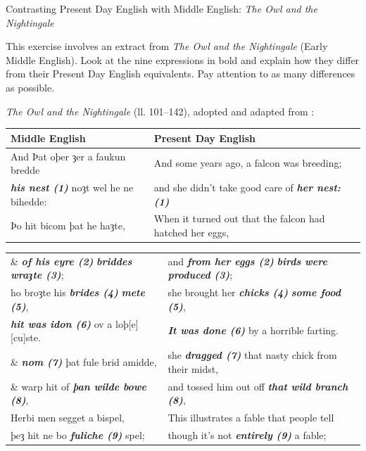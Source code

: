 \begin{exercises}{Contrasting Present Day English with Middle English: \textit{The Owl and the Nightingale}}\label{ex-Owl}

\chili{}

This exercise involves an extract from \textit{The Owl and the Nightingale} (Early Middle English). Look at the nine expressions in bold and explain how they differ from their Present Day English equivalents. Pay attention to as many differences as possible.

\textit{The Owl and the Nightingale} (ll. 101--142), adopted and adapted from \citet{Cartlidge2001}:\medskip

\noindent
\begin{tabularx}{\textwidth}{lQ}
 Middle English & Present Day English \\
 \midrule
 And Þat oþer ȝer a faukun bredde & And some years ago, a falcon was breeding;\\
 \emph{\textbf{his nest (1)}} noȝt wel he ne bihedde: & and she didn't take good care of \emph{\textbf{her nest: (1)}}\\ 
 Þo hit bicom þat he haȝte, & When it turned out that the falcon had hatched her eggs,\\
 \end{tabularx}
\begin{tabularx}{\textwidth}{lQ}
 \& \emph{\textbf{of his eyre (2)}} \emph{\textbf{briddes wraȝte (3)}}; & and \emph{\textbf{from her eggs (2)}} \emph{\textbf{birds were produced (3)}};\\
 ho broȝte his \emph{\textbf{brides (4)}} \emph{\textbf{mete (5)}}, & she brought her \emph{\textbf{chicks (4)}} \emph{\textbf{some food (5)}},\\
 \emph{\textbf{hit was idon (6)}} ov a loþ[e] [cu]ste. & \emph{\textbf{It was done (6)}} by a horrible farting.\\
 \& \emph{\textbf{nom (7)}} þat fule brid amidde, & she \emph{\textbf{dragged (7)}} that nasty chick from their midst,\\
 \& warp hit of \emph{\textbf{þan wilde bowe (8)}}, & and tossed him out off \emph{\textbf{that wild branch (8)}},\\
 Herbi men segget a bispel, & This illustrates a fable that people tell\\
 þeȝ hit ne bo \emph{\textbf{fuliche (9)}} spel; & though it's not \emph{\textbf{entirely (9)}} a fable;\\
\end{tabularx}


\end{exercises}

